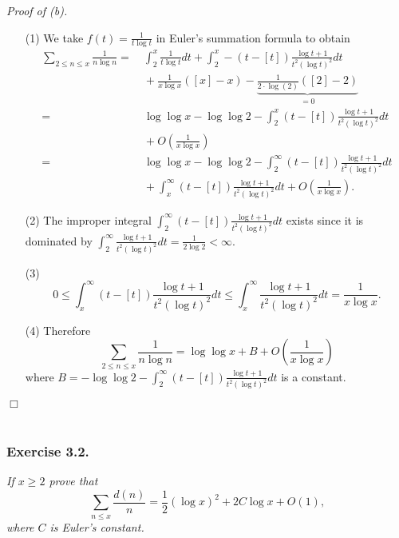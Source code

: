 \documentclass{article}
\begin{document}
\emph{Proof of (b).}
\begin{enumerate}
\item[(1)]
  We take $f(t) = \frac{1}{t\log t}$ in Euler's summation formula to obtain
  \begin{align*}
    \sum_{2 \leq n \leq x} \frac{1}{n\log n}
    = & \: \int_{2}^{x} \frac{1}{t\log t} dt
        + \int_{2}^{x} -(t-[t])\frac{\log t + 1}{t^2 (\log t)^2} dt \\
      & \: + \frac{1}{x \log x}([x]-x) - \underbrace{\frac{1}{2 \cdot \log(2)}([2]-2)}_{= 0} \\
    = & \: \log\log x - \log\log2
        - \int_{2}^{x} (t-[t])\frac{\log t + 1}{t^2 (\log t)^2} dt \\
      & \: + O\left( \frac{1}{x \log x} \right) \\
    = & \: \log\log x - \log\log2
        - \int_{2}^{\infty} (t-[t])\frac{\log t + 1}{t^2 (\log t)^2} dt \\
      & \: + \int_{x}^{\infty} (t-[t])\frac{\log t + 1}{t^2 (\log t)^2} dt
        + O\left( \frac{1}{x \log x} \right).
  \end{align*}

\item[(2)]
  The improper integral $\int_{2}^{\infty} (t-[t])\frac{\log t + 1}{t^2 (\log t)^2} dt$
  exists since it is dominated by
  $\int_{2}^{\infty} \frac{\log t + 1}{t^2 (\log t)^2} dt = \frac{1}{2\log 2} < \infty$.

\item[(3)]
  \[
    0
    \leq \int_{x}^{\infty} (t-[t])\frac{\log t + 1}{t^2 (\log t)^2} dt
    \leq \int_{x}^{\infty} \frac{\log t + 1}{t^2 (\log t)^2} dt
    = \frac{1}{x\log x}.
  \]

\item[(4)]
  Therefore
  \[
    \sum_{2 \leq n \leq x} \frac{1}{n\log n}
    = \log\log x + B + O\left( \frac{1}{x\log x} \right)
  \]
  where
  $B = - \log\log2 - \int_{2}^{\infty} (t-[t])\frac{\log t + 1}{t^2 (\log t)^2} dt$
  is a constant.
\end{enumerate}
$\Box$ \\\\






\subsubsection*{Exercise 3.2.}
\emph{If $x \geq 2$ prove that
\[
  \sum_{n \leq x} \frac{d(n)}{n}
  = \frac{1}{2}(\log x)^2 + 2 C \log x + O(1),
\]
where $C$ is Euler's constant.} \\
\end{document}

